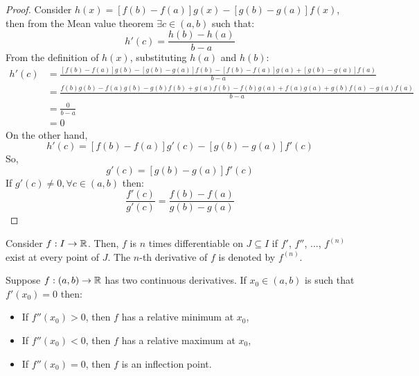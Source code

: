 \begin{proof}
    Consider $h(x) = [f(b) - f(a)]g(x) - [g(b) - g(a)]f(x)$, then from the Mean value theorem $\exists c \in (a,b)$ such that:
    \begin{equation*}
        h'(c) = \frac{h(b) - h(a)}{b-a}
    \end{equation*}
    From the definition of $h(x)$, substituting $h(a)$ and $h(b)$:
    \begin{align*}
        h'(c) &= \frac{[f(b) - f(a)]g(b) - [g(b) - g(a)]f(b) - [f(b) - f(a)]g(a) + [g(b) - g(a)]f(a)}{b-a} \\
        &= \frac{f(b)g(b) - f(a)g(b) - g(b)f(b) + g(a)f(b) - f(b)g(a) + f(a)g(a) + g(b)f(a) - g(a)f(a)}{b-a} \\
        &= \frac{0}{b-a} \\
        &= 0
    \end{align*}
    On the other hand,
    \begin{equation*}
        h'(c) = [f(b) - f(a)]g'(c) - [g(b) - g(a)]f'(c)
    \end{equation*}
    So,
    \begin{equation*}
        [f(b) - f(a)]g'(c) = [g(b) - g(a)]f'(c)
    \end{equation*}
    If $g'(c) \neq 0, \forall c \in (a,b)$ then:
    \begin{equation*}
        \frac{f'(c)}{g'(c)} = \frac{f(b) - f(a)}{g(b) - g(a)}
    \end{equation*}
\end{proof}

\begin{definition}
    Consider $f: I \to \mathbb{R}$. Then, $f$ is $n$ times differentiable on $J \subseteq I$ if $f'$, $f''$, ..., $f^{(n)}$ exist at every point of $J$. The $n$-th derivative of $f$ is denoted by $f^{(n)}$.
\end{definition}

\begin{theorem}
    Suppose $f: (a,b) \to \mathbb{R}$ has two continuous derivatives. If $x_0 \in (a,b)$ is such that $f'(x_0) = 0$ then:
    \begin{itemize}
        \item If $f''(x_0) > 0$, then $f$ has a relative minimum at $x_0$,
        \item If $f''(x_0) < 0$, then $f$ has a relative maximum at $x_0$,
        \item If $f''(x_0) = 0$, then $f$ is an inflection point.
    \end{itemize}
\end{theorem}

